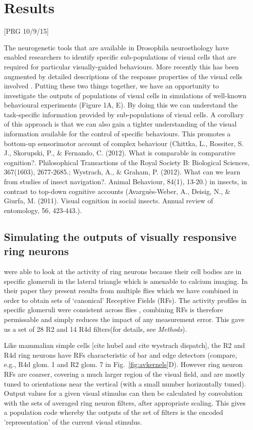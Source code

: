 \section*{Results}
[PRG 10/9/15] 

The neurogenetic tools that are available in Drosophila neuroethology have enabled researchers to identify specific sub-populations of visual cells that are required for particular visually-guided behaviours. More recently this has been augmented by detailed descriptions of the response properties of the visual cells involved \cite{Seelig2013}. Putting these two things together, we have an opportunity to investigate the outputs of populations of visual cells in simulations of well-known behavioural experiments (Figure 1A, E). By doing this we can understand the task-specific information provided by sub-populations of visual cells. A corollary of this approach is that we can also gain a tighter understanding of the visual information available for the control of specific behaviours. This promotes a bottom-up sensorimotor account of complex behaviour (Chittka, L., Rossiter, S. J., Skorupski, P., \& Fernando, C. (2012). What is comparable in comparative cognition?. Philosophical Transactions of the Royal Society B: Biological Sciences, 367(1603), 2677-2685.; Wystrach, A., \& Graham, P. (2012). What can we learn from studies of insect navigation?. Animal Behaviour, 84(1), 13-20.) in insects, in contrast to  top-down cognitive accounts (Avarguès-Weber, A., Deisig, N., \& Giurfa, M. (2011). Visual cognition in social insects. Annual review of entomology, 56, 423-443.).

\subsection*{Simulating the outputs of visually responsive ring neurons}
\label{sec:results:bar}
\cite{Seelig2013} were able to look at the activity of ring neurons because their cell bodies are in specific glomeruli in the lateral triangle which is amenable to calcium imaging. In their paper they present results from multiple flies which we
have combined in order to obtain sets of `canonical' Receptive Fields (RFs). The activity profiles in specific glomeruli were consistent across flies \cite{Seelig2013}, combining RFs is therefore permissable and simply reduces the impact of any measurement error. This gave us a set of 28 R2 and 14 R4d filters(for details, see \emph{Methods}).

Like mammalian simple cells [cite hubel and cite wystrach dispatch], the R2 and R4d ring neurons have RFs characteristic of bar and edge detectors (compare, e.g., R4d glom. 1 and R2 glom. 7 in Fig.~\ref{fig:avkernels}D).
However ring neuron RFs are coarser, covering a much larger region of the visual field, and are mostly tuned to orientations near the vertical (with a small number horizontally tuned). Output values for a given visual stimulus can then be calculated by convolution with the sets of averaged ring neuron filters, after appropriate scaling. This gives a population code whereby the outputs of the set of filters is the encoded 'representation' of the current visual stimulus.

